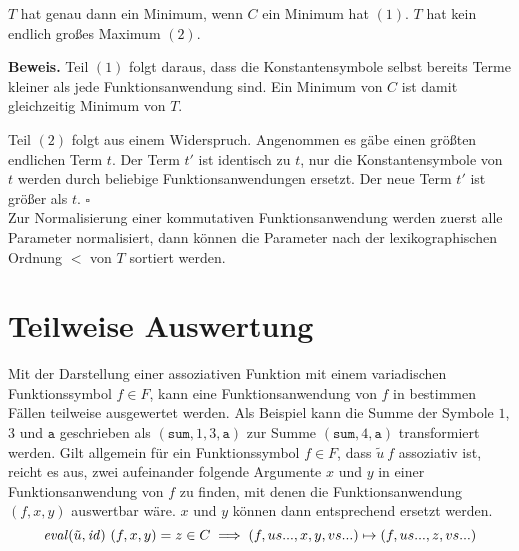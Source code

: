 \begin{lemma} \label{lemMinMax}
$T$ hat genau dann ein Minimum, wenn $C$ ein Minimum hat $(1)$. $T$ hat kein endlich großes Maximum $(2)$.
\end{lemma}

\textbf{Beweis.}
Teil $(1)$ folgt daraus, dass die Konstantensymbole selbst bereits Terme kleiner als jede Funktionsanwendung sind. Ein Minimum von $C$ ist damit gleichzeitig Minimum von $T$.

Teil $(2)$ folgt aus einem Widerspruch. Angenommen es gäbe einen größten endlichen Term $t$. Der Term $t'$ ist identisch zu $t$, nur die Konstantensymbole von $t$ werden durch beliebige Funktionsanwendungen ersetzt. Der neue Term $t'$ ist größer als $t$.
\hfill $\square$\\

Zur Normalisierung einer kommutativen Funktionsanwendung werden zuerst alle Parameter normalisiert, dann können die Parameter nach der lexikographischen Ordnung $<$ von $T$ sortiert werden. 

\section{Teilweise Auswertung} \label{subsecNormalKombinieren}

\begin{algorithm}
\DontPrintSemicolon
\caption{$\Const{combine} \colon T \rightarrow T$}\label{combine}

\end{algorithm}

Mit der Darstellung einer assoziativen Funktion mit einem variadischen Funktionssymbol $f \in F$, kann eine Funktionsanwendung von $f$ in bestimmen Fällen teilweise ausgewertet werden. Als Beispiel kann die Summe der Symbole $1$, $3$ und $\texttt{a}$ geschrieben als $(\texttt{sum}, 1, 3, \texttt{a})$ zur Summe $(\texttt{sum}, 4, \texttt{a})$ transformiert werden. 
Gilt allgemein für ein Funktionssymbol $f \in F$, dass $\tilde u~f$ assoziativ ist, reicht es aus, zwei aufeinander folgende Argumente $x$ und $y$ in einer Funktionsanwendung von $f$ zu finden, mit denen die Funktionsanwendung $(f, x, y)$ auswertbar wäre. $x$ und $y$ können dann entsprechend ersetzt werden.
$$\mathit{eval}(\tilde u, \mathit{id})~(f, x, y) = z \in C \implies (f, us..., x, y, vs...) \mapsto (f, us..., z, vs...)$$

